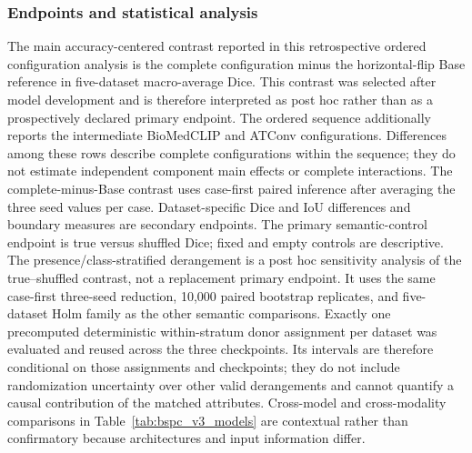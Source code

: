 \subsubsection{Endpoints and statistical analysis}
The main accuracy-centered contrast reported in this retrospective ordered
configuration analysis is the complete \methodname{} configuration minus the horizontal-flip Base
reference in five-dataset macro-average Dice. This contrast was selected after
model development and is therefore interpreted as post hoc rather than as a
prospectively declared primary endpoint. The ordered sequence additionally reports
the intermediate BioMedCLIP and ATConv configurations. Differences among these rows
describe complete configurations within the sequence; they do not estimate
independent component main effects or complete interactions. The complete-minus-Base
contrast uses case-first paired inference after averaging the three seed values per case.
Dataset-specific Dice and IoU differences
and boundary measures are secondary endpoints. The primary semantic-control
endpoint is true versus shuffled Dice; fixed and empty controls are descriptive.
The presence/class-stratified derangement is a post hoc sensitivity analysis of
the true--shuffled contrast, not a replacement primary endpoint. It uses the
same case-first three-seed reduction, 10,000 paired bootstrap replicates, and
five-dataset Holm family as the other semantic comparisons. Exactly one
precomputed deterministic within-stratum donor assignment per dataset was
evaluated and reused across the three checkpoints. Its intervals are therefore
conditional on those assignments and checkpoints; they do not include
randomization uncertainty over other valid derangements and cannot quantify a
causal contribution of the matched attributes.
Cross-model and cross-modality comparisons in Table~\ref{tab:bspc_v3_models}
are contextual rather than confirmatory because architectures and input
information differ.

